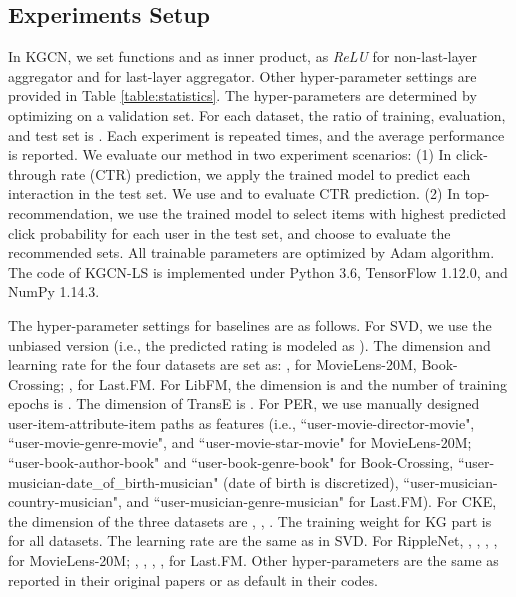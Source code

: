 \documentclass[sigconf]{acmart}
\begin{document}
	
	\subsection{Experiments Setup}
		In KGCN, we set functions  and  as inner product,  as \textit{ReLU} for non-last-layer aggregator and  for last-layer aggregator.
		Other hyper-parameter settings are provided in Table \ref{table:statistics}.
		The hyper-parameters are determined by optimizing  on a validation set.		
		For each dataset, the ratio of training, evaluation, and test set is .
		Each experiment is repeated  times, and the average performance is reported.
		We evaluate our method in two experiment scenarios:
		(1) In click-through rate (CTR) prediction, we apply the trained model to predict each interaction in the test set.
		We use  and  to evaluate CTR prediction.
		(2) In top- recommendation, we use the trained model to select  items with highest predicted click probability for each user in the test set, and choose  to evaluate the recommended sets.
		All trainable parameters are optimized by Adam algorithm.
		The code of KGCN-LS is implemented under Python 3.6, TensorFlow 1.12.0, and NumPy 1.14.3.
		
		The hyper-parameter settings for baselines are as follows.
		For SVD, we use the unbiased version (i.e., the predicted rating is modeled as ).
		The dimension and learning rate for the four datasets are set as: ,  for MovieLens-20M, Book-Crossing; ,  for Last.FM.
		For LibFM, the dimension is  and the number of training epochs is .
		The dimension of TransE is .
		For PER, we use manually designed user-item-attribute-item paths as features (i.e., ``user-movie-director-movie", ``user-movie-genre-movie", and ``user-movie-star-movie" for MovieLens-20M; ``user-book-author-book" and ``user-book-genre-book" for Book-Crossing, ``user-musician-date\_of\_birth-musician" (date of birth is discretized), ``user-musician-country-musician", and ``user-musician-genre-musician" for Last.FM).
		For CKE, the dimension of the three datasets are , , .
		The training weight for KG part is  for all datasets.
		The learning rate are the same as in SVD.
		For RippleNet, , , , ,  for MovieLens-20M; , , , ,  for Last.FM.
		Other hyper-parameters are the same as reported in their original papers or as default in their codes.
		
	
	\iffalse
\end{document}
